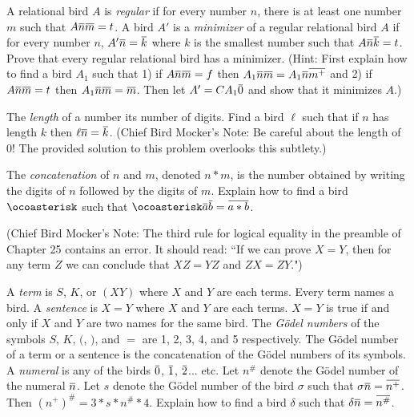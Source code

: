 \documentclass[12pt, letterpaper]{article}
\begin{document}
\begin{prob}{24.10}
A relational bird $A$ is \emph{regular} if for every number $n$, there is at least one number $m$ such that $A\noverline{n}\noverline{m} = t$. A bird $A'$ is a \emph{minimizer} of a regular relational bird $A$ if for every number $n$, $A'\noverline{n} = \noverline{k}$ where $k$ is the smallest number such that $A\noverline{n}\noverline{k} = t$. Prove that every regular relational bird has a minimizer. (Hint: First explain how to find a bird $A_1$ such that 1) if $A\noverline{n}\noverline{m} = f$ then $A_1\noverline{n}\noverline{m} = A_1\noverline{n}\noverline{m^+}$ and 2) if $A\noverline{n}\noverline{m} = t$ then $A_1\noverline{n}\noverline{m} = \noverline{m}$. Then let $A' = CA_1\noverline{0}$ and show that it minimizes $A$.)
\end{prob}

\begin{prob}{24.11}
The \emph{length} of a number its number of digits. Find a bird $\ell$ such that if $n$ has length $k$ then $\ell\noverline{n} = \noverline{k}$. (Chief Bird Mocker's Note: Be careful about the length of 0! The provided solution to this problem overlooks this subtlety.)
\end{prob}

\begin{prob}{24.12}
The \emph{concatenation} of $n$ and $m$, denoted $n \ast m$, is the number obtained by writing the digits of $n$ followed by the digits of $m$. Explain how to find a bird $\ocoasterisk$ such that $\ocoasterisk\noverline{a}\noverline{b} = \noverline{a \ast b}$.
\end{prob}

\noindent(Chief Bird Mocker's Note: The third rule for logical equality in the preamble of Chapter 25 contains an error. It should read: ``If we can prove $X = Y$, then for any term $Z$ we can conclude that $XZ = YZ$ and $ZX = ZY$.")

\begin{prob}{25.1}
A \emph{term} is $S$, $K$, or $(XY)$ where $X$ and $Y$ are each terms. Every term names a bird. A \emph{sentence} is $X = Y$ where $X$ and $Y$ are each terms. $X = Y$ is true if and only if $X$ and $Y$ are two names for the same bird. The \emph{G\"odel numbers} of the symbols $S$, $K$, $($, $)$, and $=$ are 1, 2, 3, 4, and 5 respectively. The G\"odel number of a term or a sentence is the concatenation of the G\"odel numbers of its symbols. A \emph{numeral} is any of the birds $\noverline{0}$, $\noverline{1}$, $\noverline{2}$... etc. Let $n^\#$ denote the G\"odel number of the numeral $\noverline{n}$. Let $s$ denote the G\"odel number of the bird $\sigma$ such that $\sigma \noverline{n} = \noverline{n^+}$. Then $(n^+)^\# = 3 \ast s \ast n^\# \ast 4$. Explain how to find a bird $\delta$ such that $\delta \noverline{n} = \noverline{n^\#}$.
\end{prob}
\end{document}
